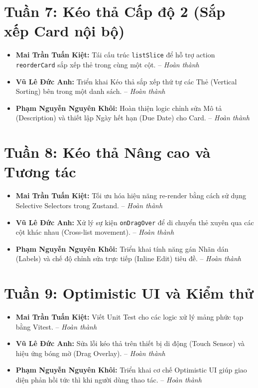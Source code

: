 \section*{Tuần 7: Kéo thả Cấp độ 2 (Sắp xếp Card nội bộ)}
\begin{itemize}
    \item \textbf{Mai Trần Tuấn Kiệt:} Tái cấu trúc \texttt{listSlice} để hỗ trợ action \texttt{reorderCard} sắp xếp thẻ trong cùng một cột. -- \textit{Hoàn thành}
    \item \textbf{Vũ Lê Đức Anh:} Triển khai Kéo thả sắp xếp thứ tự các Thẻ (Vertical Sorting) bên trong một danh sách. -- \textit{Hoàn thành}
    \item \textbf{Phạm Nguyễn Nguyên Khôi:} Hoàn thiện logic chỉnh sửa Mô tả (Description) và thiết lập Ngày hết hạn (Due Date) cho Card. -- \textit{Hoàn thành}
\end{itemize}

\section*{Tuần 8: Kéo thả Nâng cao và Tương tác}
\begin{itemize}
    \item \textbf{Mai Trần Tuấn Kiệt:} Tối ưu hóa hiệu năng re-render bằng cách sử dụng Selective Selectors trong Zustand. -- \textit{Hoàn thành}
    \item \textbf{Vũ Lê Đức Anh:} Xử lý sự kiện \texttt{onDragOver} để di chuyển thẻ xuyên qua các cột khác nhau (Cross-list movement). -- \textit{Hoàn thành}
    \item \textbf{Phạm Nguyễn Nguyên Khôi:} Triển khai tính năng gán Nhãn dán (Labels) và chế độ chỉnh sửa trực tiếp (Inline Edit) tiêu đề. -- \textit{Hoàn thành}
\end{itemize}

\section*{Tuần 9: Optimistic UI và Kiểm thử}
\begin{itemize}
    \item \textbf{Mai Trần Tuấn Kiệt:} Viết Unit Test cho các logic xử lý mảng phức tạp bằng Vitest. -- \textit{Hoàn thành}
    \item \textbf{Vũ Lê Đức Anh:} Sửa lỗi kéo thả trên thiết bị di động (Touch Sensor) và hiệu ứng bóng mờ (Drag Overlay). -- \textit{Hoàn thành}
    \item \textbf{Phạm Nguyễn Nguyên Khôi:} Triển khai cơ chế Optimistic UI giúp giao diện phản hồi tức thì khi người dùng thao tác. -- \textit{Hoàn thành}
\end{itemize}


